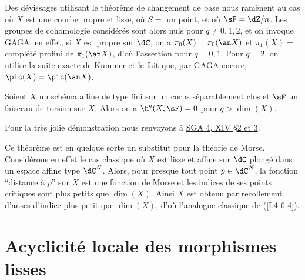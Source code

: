 Des dévissages utilisant le théorème de changement de base nous ramènent au 
cas où $X$ est une courbe propre et lisse, où $S=$ un point, et où 
$\sF=\dZ/n$. Les groupes de cohomologie considérés sont alors nuls pour 
$q\ne 0,1,2$, et on invoque \hyperlink{cite.se55}{GAGA}: en effet, si $X$ est propre sur $\dC$, 
on a $\pi_0(X) = \pi_0(\an X)$ et $\pi_1(X) = $ complété profini de 
$\pi_1(\an X)$, d'où l'assertion pour $q=0,1$. Pour $q=2$, on utilise la 
suite exacte de Kummer et le fait que, par \hyperlink{cite.se55}{GAGA} encore, 
$\pic(X)=\pic(\an X)$. 





\begin{theorem}\label{I:4-6-4}
Soient $X$ un schéma affine de type fini sur un corps séparablement clos et 
$\sF$ un faisceau de torsion sur $X$. Alors on a $\h^q(X,\sF) = 0$ pour 
$q>\dim(X)$. 
\end{theorem}

Pour la très jolie démonstration nous renvoyons à
\hyperlink{cite.sga4}{SGA 4, XIV \S 2 et 3}. 





\begin{sourceexampledotdash}[Remarque]\label{I:4-6-5}

Ce théorème est en quelque sorte un substitut pour la théorie de Morse. 
Considérons en effet le cas classique où $X$ est lisse et affine sur $\dC$ 
plongé dans un espace affine type $\dC^N$. Alors, pour presque tout point 
$p\in\dC^N$, la fonction ``distance à $p$'' sur $X$ est une fonction de Morse 
et les indices de ses points critiques sont plus petits que $\dim(X)$. Ainsi 
$X$ est obtenu par recollement d'anses d'indice plus petit que $\dim(X)$, d'où 
l'analogue classique de (\ref{I:4-6-4}). 
\end{sourceexampledotdash}




















\section{Acyclicité locale des morphismes lisses}\label{I:5}

